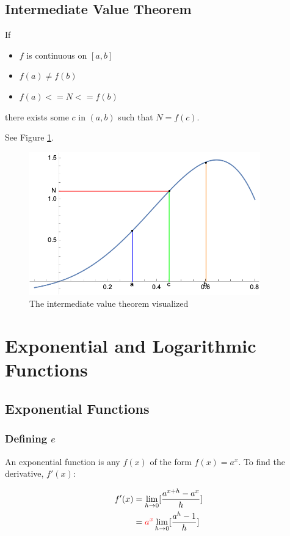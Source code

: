 \documentclass[12pt]{article}
\begin{document}
\subsection{Intermediate Value Theorem}
\begin{shaded}
    If
    \begin{itemize}
        \item $f$ is continuous on $[a,b]$
        \item $f(a) \neq f(b)$
        \item $f(a) <= N <= f(b)$
    \end{itemize}

    there exists some $c$ in $(a,b)$ such that $N = f(c)$.
    
    See Figure \ref{ivt}.
\end{shaded}
\begin{figure}[!ht]
    \centering
    \includegraphics[width=10.0cm]{misc/imvt.png}
    \caption{The intermediate value theorem visualized}
    \label{ivt}
\end{figure}
\newpage
\section{Exponential and Logarithmic Functions}
\subsection{Exponential Functions}
\subsubsection{Defining \texorpdfstring{$e$}{TEXT}}

An exponential function is any $f(x)$ of the form $f(x) = a^x$. To find the derivative, $f'(x)$:

\begin{equation}
    \begin{split}
        f'(x) &= \lim_{h\to 0} [\frac{a^{x+h}-a^x}{h}]\\
        &=\textcolor{red}{a^x}\lim_{h\to 0}[\frac{a^h-1}{h}]\\
    \end{split}
\end{equation}
\end{document}

